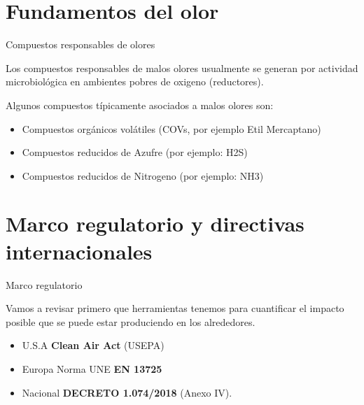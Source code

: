 \subtitle{Olores}
\begin{frame}
  \titlepage
\end{frame}
\section{Fundamentos del olor}

\begin{frame}{Compuestos responsables de olores}

Los compuestos responsables de malos olores usualmente se generan por actividad microbiológica en ambientes pobres de oxigeno (reductores).

Algunos compuestos típicamente asociados a malos olores son:
\begin{itemize}
    \item Compuestos orgánicos volátiles (COVs, por ejemplo Etil Mercaptano)
    \item Compuestos reducidos de Azufre (por ejemplo: H2S)
    \item Compuestos reducidos de Nitrogeno (por ejemplo: NH3)
\end{itemize}       
\end{frame}


\section{Marco regulatorio y directivas internacionales}
\begin{frame}{Marco regulatorio}
 
   Vamos a revisar primero que herramientas tenemos para cuantificar el impacto posible que se puede estar produciendo en los alrededores.
    
   \begin{itemize}
       \item \alert{U.S.A}    \textbf{Clean Air Act} (USEPA)
       \item \alert{Europa}   Norma UNE \textbf{EN 13725}
       \item \alert{Nacional} \textbf{DECRETO 1.074/2018} (Anexo IV).  
   \end{itemize}    
\end{frame}

